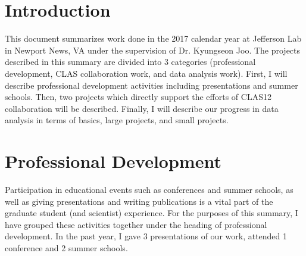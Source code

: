 %
%

\section{Introduction}
This document summarizes work done in the 2017 calendar year at Jefferson Lab in Newport News, VA under the supervision of Dr. Kyungseon Joo.  The projects described in this summary are divided into 3 categories  (professional development, CLAS collaboration work, and data analysis work).  First, I will describe professional development activities including presentations and summer schools.  Then, two projects which directly support the efforts of CLAS12 collaboration will be described.  Finally, I will describe our progress in data analysis in terms of basics, large projects, and small projects.  

%
%
\section{Professional Development}
Participation in educational events such as conferences and summer schools, as well as giving presentations and writing publications is a vital part of the graduate student (and scientist) experience.  For the purposes of this summary, I have grouped these activities together under the heading of professional development.  In the past year, I gave 3 presentations of our work, attended 1 conference and 2 summer schools.  
